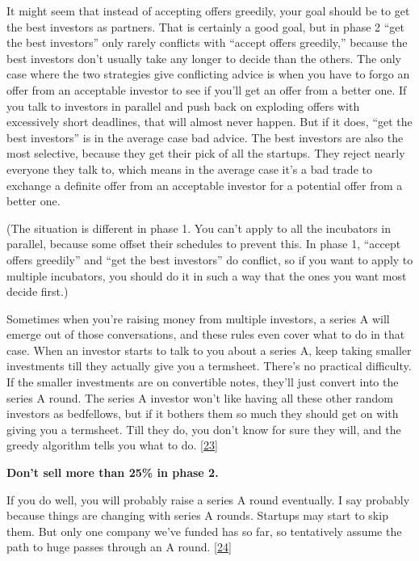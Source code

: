 It might seem that instead of accepting offers greedily, your goal
should be to get the best investors as partners. That is certainly a
good goal, but in phase 2 ``get the best investors'' only rarely
conflicts with ``accept offers greedily,'' because the best investors
don't usually take any longer to decide than the others. The only case
where the two strategies give conflicting advice is when you have to
forgo an offer from an acceptable investor to see if you'll get an offer
from a better one. If you talk to investors in parallel and push back on
exploding offers with excessively short deadlines, that will almost
never happen. But if it does, ``get the best investors'' is in the
average case bad advice. The best investors are also the most selective,
because they get their pick of all the startups. They reject nearly
everyone they talk to, which means in the average case it's a bad trade
to exchange a definite offer from an acceptable investor for a potential
offer from a better one.

(The situation is different in phase 1. You can't apply to all the
incubators in parallel, because some offset their schedules to prevent
this. In phase 1, ``accept offers greedily'' and ``get the best
investors'' do conflict, so if you want to apply to multiple incubators,
you should do it in such a way that the ones you want most decide
first.)

Sometimes when you're raising money from multiple investors, a series A
will emerge out of those conversations, and these rules even cover what
to do in that case. When an investor starts to talk to you about a
series A, keep taking smaller investments till they actually give you a
termsheet. There's no practical difficulty. If the smaller investments
are on convertible notes, they'll just convert into the series A round.
The series A investor won't like having all these other random investors
as bedfellows, but if it bothers them so much they should get on with
giving you a termsheet. Till they do, you don't know for sure they will,
and the greedy algorithm tells you what to do. {[}\hyperref[f23n]{23}{]}

\textbf{Don't sell more than 25\% in phase 2.}

If you do well, you will probably raise a series A round eventually. I
say probably because things are changing with series A rounds. Startups
may start to skip them. But only one company we've funded has so far, so
tentatively assume the path to huge passes through an A round.
{[}\hyperref[f24n]{24}{]}

